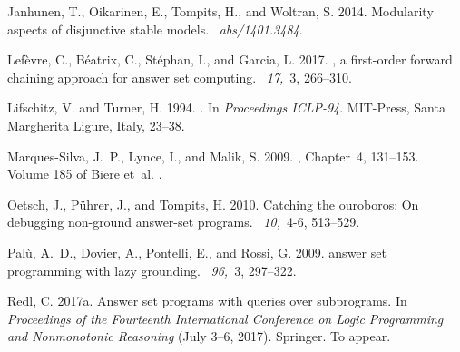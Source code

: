 \begin{thebibliography}{}
{\sc Janhunen, T.}, {\sc Oikarinen, E.}, {\sc Tompits, H.}, {\sc and} {\sc
  Woltran, S.} 2014.
\newblock Modularity aspects of disjunctive stable models.
~{\em abs/1401.3484}.

{\sc Lef{\`{e}}vre, C.}, {\sc B{\'{e}}atrix, C.}, {\sc St{\'{e}}phan, I.}, {\sc
  and} {\sc Garcia, L.} 2017.
, a first-order forward chaining approach for answer set
  computing.
~{\em 17,\/}~3, 266--310.

{\sc Lifschitz, V.} {\sc and} {\sc Turner, H.} 1994.
.
\newblock In {\em Proceedings ICLP-94}. MIT-Press, Santa Margherita Ligure,
  Italy, 23--38.

{\sc Marques-Silva, J.~P.}, {\sc Lynce, I.}, {\sc and} {\sc Malik, S.} 2009.
, Chapter~4,
  131--153.
\newblock Volume 185 of Biere et~al\mbox{.} .

{\sc Oetsch, J.}, {\sc P{\"{u}}hrer, J.}, {\sc and} {\sc Tompits, H.} 2010.
\newblock Catching the ouroboros: On debugging non-ground answer-set programs.
~{\em 10,\/}~4-6, 513--529.

{\sc Pal{\`{u}}, A.~D.}, {\sc Dovier, A.}, {\sc Pontelli, E.}, {\sc and} {\sc
  Rossi, G.} 2009.
 answer set programming with lazy grounding.
~{\em 96,\/}~3, 297--322.

{\sc Redl, C.} 2017a.
\newblock Answer set programs with queries over subprograms.
\newblock In {\em Proceedings of the Fourteenth International Conference on
  Logic Programming and Nonmonotonic Reasoning} (July 3--6, 2017). Springer.
\newblock To appear.


\end{thebibliography}
